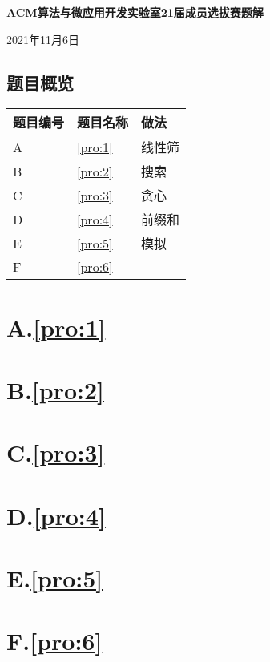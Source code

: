 \documentclass[
	lang=cn,
	color=blue
]{elegantbook}
\begin{document}
\begin{titlepage}
    \begin{center}
		\LARGE
		\textbf{ACM算法与微应用开发实验室21届成员选拔赛题解} \par
		\normalsize
		\vspace{0.5cm}
		2021年11月6日
	\end{center}

    \section*{题目概览}
    \begin{center}
        \begin{tabularx}{\textwidth}{M|M|M}
            \toprule
            \textbf{题目编号} & \textbf{题目名称} & \textbf{做法} \\
            \midrule
            A & \ref*{pro:1} & 线性筛 \\
            B & \ref*{pro:2} & 搜索 \\
            C & \ref*{pro:3} & 贪心 \\
            D & \ref*{pro:4} & 前缀和 \\
            E & \ref*{pro:5} & 模拟 \\
            F & \ref*{pro:6} & \\
            \bottomrule
        \end{tabularx}
    \end{center}
\end{titlepage}

\chapter*{A.\quad \ref*{pro:1}}

\chapter*{B.\quad \ref*{pro:2}}

\chapter*{C.\quad \ref*{pro:3}}

\chapter*{D.\quad \ref*{pro:4}}

\chapter*{E.\quad \ref*{pro:5}}

\chapter*{F.\quad \ref*{pro:6}}
\end{document}
